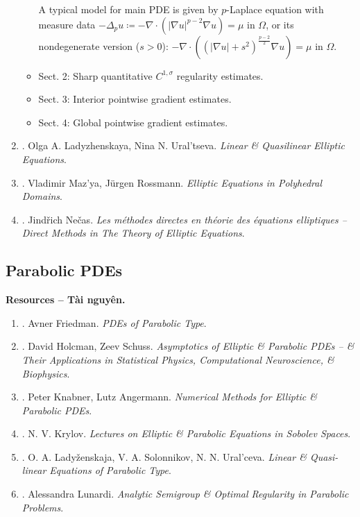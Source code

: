 \documentclass{article}
\begin{document}
\begin{enumerate}
\begin{itemize}
		A typical model for main PDE is given by $p$-Laplace equation with measure data $-\Delta_p u\coloneqq-\nabla\cdot(|\nabla u|^{p - 2}\nabla u) = \mu$ in $\Omega$, or its nondegenerate version ($s > 0$): $-\nabla\cdot((|\nabla u| + s^2)^{\frac{p - 2}{2}}\nabla u) = \mu$ in $\Omega$.
		\item {\sf Sect. 2: Sharp quantitative $C^{1,\sigma}$ regularity estimates.}
		\item {\sf Sect. 3: Interior pointwise gradient estimates.}
		\item {\sf Sect. 4: Global pointwise gradient estimates.}
	\end{itemize}
	\item \cite{Ladyzhenskaya_Uraltseva1968}. {\sc Olga A. Ladyzhenskaya, Nina N. Ural'tseva}. {\it Linear \& Quasilinear Elliptic Equations}.
	\item \cite{Mazya_Rossmann2010}. {\sc Vladimir Maz'ya, J\"{u}rgen Rossmann}. {\it Elliptic Equations in Polyhedral Domains}.
	\item \cite{Necas1967,Necas2012}. {\sc Jind\v{r}ich Ne\v{c}as}. {\it Les m\'{e}thodes directes en th\'{e}orie des \'{e}quations elliptiques -- Direct Methods in The Theory of Elliptic Equations}.
\end{enumerate}

\subsection{Parabolic PDEs}
\textbf{\textsf{Resources -- Tài nguyên.}}
\begin{enumerate}
	\item \cite{Friedman1964}. {\sc Avner Friedman}. {\it PDEs of Parabolic Type}.
	\item \cite{Holcman_Schuss2018}. {\sc David Holcman, Zeev Schuss}. {\it Asymptotics of Elliptic \& Parabolic PDEs -- \& Their Applications in Statistical Physics, Computational Neuroscience, \& Biophysics}.
	\item \cite{Knabner_Angermann2003}. {\sc Peter Knabner, Lutz Angermann}. {\it Numerical Methods for Elliptic \& Parabolic PDEs}.
	\item \cite{Krylov2008}. {\sc N. V. Krylov}. {\it Lectures on Elliptic \& Parabolic Equations in Sobolev Spaces}.
	\item \cite{Ladyzhenskaja_Solonnikov_Uralceva1968}. {\sc O. A. Lady\v{z}enskaja, V. A. Solonnikov, N. N. Ural'ceva}. {\it Linear \& Quasi-linear Equations of Parabolic Type}.
	\item \cite{Lunardi1995}. {\sc Alessandra Lunardi}. {\it Analytic Semigroup \& Optimal Regularity in Parabolic Problems}.
\end{enumerate}
\end{document}
